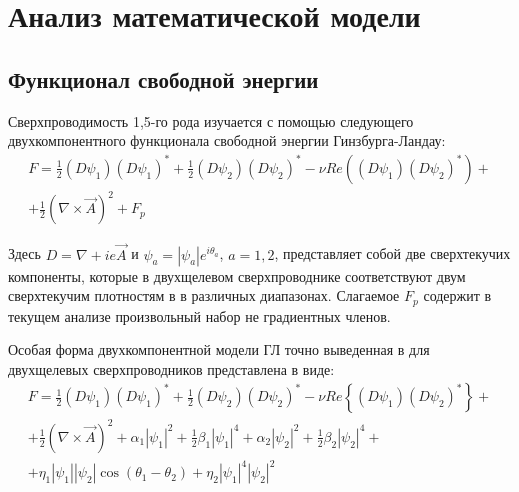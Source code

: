 \chapter{Анализ математической модели}

\section{Функционал свободной энергии}

Сверхпроводимость 1,5-го рода изучается с помощью следующего двухкомпонентного 
функционала свободной энергии Гинзбурга-Ландау:
\begin{gather}
    F = \frac{1}{2}(D\psi_1)(D\psi_1)^* + \frac{1}{2}(D\psi_2)(D\psi_2)^* - 
        \nu Re\left( (D\psi_1)(D\psi_2)^* \right) + \nonumber \\
        + \frac{1}{2}\left(\nabla\times\vec{A}\right)^2 + F_p
    \label{eq:1}
\end{gather}

Здесь \( D = \nabla + ie\vec{A} \) и \( \psi_a = |\psi_a|e^{i\theta_a} \), 
\( a = 1,2 \), представляет собой две сверхтекучих компоненты, которые в 
двухщелевом сверхпроводнике соответствуют двум сверхтекучим плотностям в 
в различных диапазонах. Слагаемое \( F_p \) содержит в текущем анализе 
произвольный набор не градиентных членов.

Особая форма двухкомпонентной модели ГЛ точно выведенная в
\cite{bib:8,bib:9,bib:10} для двухщелевых сверхпроводников представлена в виде:
\begin{gather}
    F = \frac{1}{2}(D\psi_1)(D\psi_1)^* + \frac{1}{2}(D\psi_2)(D\psi_2)^* - 
        \nu Re\left\{ (D\psi_1)(D\psi_2)^* \right\} + \nonumber \\
        + \frac{1}{2}\left(\nabla\times\vec{A}\right)^2 + 
        \alpha_1|\psi_1|^2 + \frac{1}{2}\beta_1|\psi_1|^4 + 
        \alpha_2|\psi_2|^2 + \frac{1}{2}\beta_2|\psi_2|^4 + \nonumber \\
        + \eta_1|\psi_1||\psi_2| \cos(\theta_1-\theta_2) + 
        \eta_2|\psi_1|^4|\psi_2|^2
    \label{eq:2}
\end{gather}

